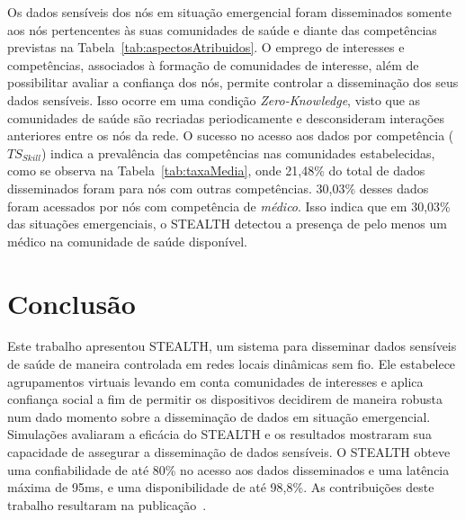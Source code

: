 \documentclass[12pt]{article}
\begin{document}
\vspace{0.3cm}

Os dados sensíveis dos nós em situação emergencial foram disseminados somente aos nós pertencentes às suas comunidades de saúde e diante das competências previstas na Tabela~\ref{tab:aspectosAtribuidos}. O emprego de interesses e competências, associados à formação de comunidades de interesse, além de possibilitar avaliar a confiança dos nós, permite controlar a disseminação dos seus dados sensíveis. Isso ocorre em uma condição \textit{Zero-Knowledge}, visto que as comunidades de saúde são recriadas periodicamente e desconsideram interações anteriores entre os nós da rede. O sucesso no acesso aos dados por competência ($TS_{Skill}$) indica a prevalência das competências nas comunidades estabelecidas, como se observa na Tabela~\ref{tab:taxaMedia}, onde 21,48\% do total de dados disseminados foram para nós com outras competências. 30,03\% desses dados foram acessados por nós com competência de \textit{médico}. Isso indica que em 30,03\% das situações emergenciais, o \mbox{STEALTH} detectou a presença de pelo menos um médico na comunidade de saúde disponível.

\vspace{-0.2cm}




\section{Conclusão}
\label{sec:conc}

Este trabalho apresentou \mbox{STEALTH}, um sistema para disseminar dados sensíveis de saúde de maneira controlada em redes locais dinâmicas sem fio. Ele estabelece agrupamentos virtuais levando em conta comunidades de interesses e aplica confiança social a fim de permitir os dispositivos decidirem de maneira robusta num dado momento sobre a disseminação de dados em situação emergencial. Simulações avaliaram a eficácia do \mbox{STEALTH} e os resultados mostraram sua capacidade de assegurar a disseminação de dados sensíveis. O \mbox{STEALTH} obteve uma confiabilidade de até 80\% no acesso aos dados disseminados e uma latência máxima de 95ms, e uma disponibilidade de até 98,8\%. As contribuições deste trabalho resultaram na publicação~\cite{batista2019sbseg}.



\end{document}
